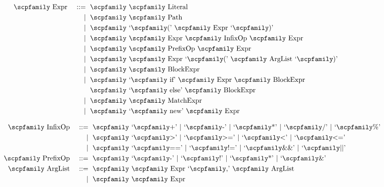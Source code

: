 \documentclass[
  oneside,
  english,
  coorientadorbanca,
  noabntexcite
]{ufsc-thesis-rn46-2019}
\def\bnfdef{::=}
\newcommand{\codett}[1]{\text{\scpfamily#1}}
\newcommand{\code}[1]{\text{\scpfamily\setlength\spaceskip{0.35em}#1}}
\newcommand{\bnfvar}[1]{\codett{#1}}
\newcommand{\bnfter}[1]{\textrm{`}\codett{#1}\textrm{'}}
\newcommand{\bnfor}[1]{{$\mid$} #1}
\newcommand{\bnfprod}[2]{\bnfvar{#1} & \ & \bnfdef{} & \ \code{#2}}
\newcommand{\bnfmore}[1]{            & \ & \mid{}    & \ \code{#1}}
\newcommand{\bnfcont}[1]{            & \ &           & \ \code{#1}}
\begin{document}
\begin{figure}[ht]
  \centering
  \small
  \begin{subfigure}[b]{0.4\textwidth}
    \begin{alignat*}{2}
      \bnfprod{Expr}{
        \bnfvar{Literal}
      } \\
      \bnfmore{
        \bnfvar{Path}
      } \\
      \bnfmore{
        \bnfter{(}
        \bnfvar{Expr}
        \bnfter{)}
      } \\
      \bnfmore{
        \bnfvar{Expr}
        \bnfvar{InfixOp}
        \bnfvar{Expr}
      } \\
      \bnfmore{
        \bnfvar{PrefixOp}
        \bnfvar{Expr}
      } \\
      \bnfmore{
        \bnfvar{Expr}
        \bnfter{(}
        \bnfvar{ArgList}
        \bnfter{)}
      } \\
      \bnfmore{
        \bnfvar{BlockExpr}
      } \\
      \bnfmore{
        \bnfter{if}
        \bnfvar{Expr}
        \bnfvar{BlockExpr}
      } \\
      \bnfcont{
        \bnfter{else}
        \bnfvar{BlockExpr}
      } \\
      \bnfmore{
        \bnfvar{MatchExpr}
      } \\
      \bnfmore{
        \bnfter{new}
        \bnfvar{Expr}
      }
    \end{alignat*}
  \end{subfigure}
  \begin{subfigure}[b]{0.4\textwidth}
    \begin{alignat*}{2}
      \bnfprod{InfixOp}{
        \bnfter{+}
        \bnfor{\bnfter{-}}
        \bnfor{\bnfter{*}}
        \bnfor{\bnfter{/}}
        \bnfor{\bnfter{\%}}
      } \\
      \bnfmore{
        \bnfter{>}
        \bnfor{\bnfter{>=}}
        \bnfor{\bnfter{<}}
        \bnfor{\bnfter{<=}}
      } \\
      \bnfmore{
        \bnfter{==}
        \bnfor{\bnfter{!=}}
        \bnfor{\bnfter{\&\&}}
        \bnfor{\bnfter{||}}
      } \\
      \bnfprod{PrefixOp}{
        \bnfter{-}
        \bnfor{\bnfter{!}}
        \bnfor{\bnfter{*}}
        \bnfor{\bnfter{\&}}
      } \\
      \bnfprod{ArgList}{
        \bnfvar{Expr}
        \bnfter{,}
        \bnfvar{ArgList}
      } \\
      \bnfmore{
        \bnfvar{Expr}
}
\end{alignat*}
\end{subfigure}
\end{figure}
\end{document}
